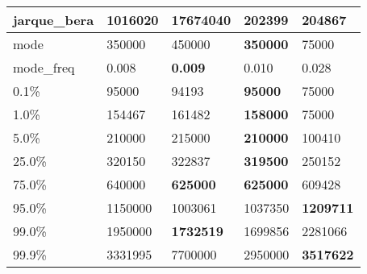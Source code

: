 \begin{table}[H]
\begin{tabular}{|l|m{10em}|m{10em}|m{10em}|m{10em}|}
\hline jarque\_bera & 1016020 & \cellcolor[rgb]{0.9, 0.54, 0.52} 17674040 & 202399 & \bfseries 204867 \\
\hline mode & 350000 & 450000 & \bfseries 350000 & \cellcolor[rgb]{0.9, 0.54, 0.52} 75000 \\
\hline mode\_freq & 0.008 & \bfseries 0.009 & 0.010 & \cellcolor[rgb]{0.9, 0.54, 0.52} 0.028 \\
\hline 0.1\% & 95000 & 94193 & \bfseries 95000 & \cellcolor[rgb]{0.9, 0.54, 0.52} 75000 \\
\hline 1.0\% & 154467 & 161482 & \bfseries 158000 & \cellcolor[rgb]{0.9, 0.54, 0.52} 75000 \\
\hline 5.0\% & 210000 & 215000 & \bfseries 210000 & \cellcolor[rgb]{0.9, 0.54, 0.52} 100410 \\
\hline 25.0\% & 320150 & 322837 & \bfseries 319500 & \cellcolor[rgb]{0.9, 0.54, 0.52} 250152 \\
\hline 75.0\% & 640000 & \bfseries 625000 & \bfseries 625000 & \cellcolor[rgb]{0.9, 0.54, 0.52} 609428 \\
\hline 95.0\% & 1150000 & \cellcolor[rgb]{0.9, 0.54, 0.52} 1003061 & 1037350 & \bfseries 1209711 \\
\hline 99.0\% & 1950000 & \bfseries 1732519 & 1699856 & \cellcolor[rgb]{0.9, 0.54, 0.52} 2281066 \\
\hline 99.9\% & 3331995 & \cellcolor[rgb]{0.9, 0.54, 0.52} 7700000 & 2950000 & \bfseries 3517622 \\
\hline
\end{tabular}
\end{table}
